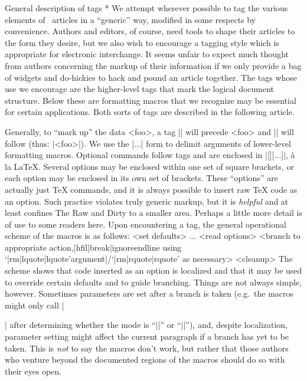 \subhead * General description of tags *
We attempt wherever possible to tag the various elements of \TUB\
articles in a ``generic'' way, modified in some respects by
convenience.  Authors and editors, of course, need tools to shape
their articles to the form they desire, but we also wish to encourage
a tagging style which is appropriate for electronic interchange.  It
seems unfair to expect much thought from authors concerning the
markup of their information if we only provide a bag of widgets and
do-hickies to hack and pound an article together.  The tags whose use
we encourage are the higher-level tags that mark the logical
document structure.  Below these are formatting macros that we
recognize may be essential for certain applications.  Both sorts of
tags are described in the following article.

Generally, to ``mark up'' the data <foo>, a tag |\xxx| will precede
<foo> and |\endxxx| will follow (thus: |\xxx <foo>\endxxx|).  We use
the |{...}| form to delimit arguments of lower-level formatting
macros.  Optional commands follow tags and are enclosed in
|[\lastoption][...]|, \`a la \LaTeX.  Several options may be enclosed
within one set of square brackets, or each
option may be enclosed in its own set of brackets.  These ``options''
are actually just \TeX{} commands, and it is always possible to
insert raw \TeX{} code as an option.  Such practice violates truly
generic markup, but it is {\it helpful\/} and at least confines
The Raw and Dirty to a smaller area.
\subtext
Perhaps a little more detail is of use to some readers here.
Upon encountering a tag, the general operational scheme of the
macros is as follows:
\verbatim[\makecomment\%]%
[\def\lquote{`}\def\rquote{'}\makeescape\|\makebgroup\`\makeegroup\']%
[\displaystyle{\everypar{\hangindent2\parindent}\advance\baselineskip by 1pt}]
<read tag>
\begingroup
<set defaults>
\the\every...
<read options>
<branch to appropriate action,|hfil|break|ignoreendline
using `|rm|lquote|lquote'argument|/`|rm|rquote|rquote' as necessary>
<cleanup>
\endgroup
\endverbatim
The scheme shows that code inserted as an option is localized and that
it may be used to override certain defaults and to guide branching.
Things are not always simple, however.  Sometimes parameters are set
after a branch is taken (e.g.\ the macros might only call |\raggedright|
after determining whether the mode is ``|\inline|'' or
``|\display|''), and, despite localization, parameter setting might
affect the current paragraph if a branch has yet to be taken.
This is {\it not\/} to say the macros don't work, but rather that
those authors who venture beyond the documented regions of the
macros should do so with their eyes open.
\endtext

